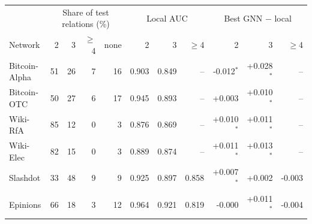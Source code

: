 \begin{tabular}{@{}lrrrrrrrrrr@{}}
\toprule
 & \multicolumn{4}{c}{Share of test relations (\%)} & \multicolumn{3}{c}{Local AUC} & \multicolumn{3}{c}{Best GNN $-$ local} \\
Network & 2 & 3 & $\ge$4 & none & 2 & 3 & $\ge$4 & 2 & 3 & $\ge$4 \\
\midrule
Bitcoin-Alpha & 51 & 26 & 7 & 16 & 0.903 & 0.849 & -- & -0.012$^\ast$ & +0.028$^\ast$ & -- \\
Bitcoin-OTC & 50 & 27 & 6 & 17 & 0.945 & 0.893 & -- & +0.003 & +0.010$^\ast$ & -- \\
Wiki-RfA & 85 & 12 & 0 & 3 & 0.876 & 0.869 & -- & +0.010$^\ast$ & +0.011$^\ast$ & -- \\
Wiki-Elec & 82 & 15 & 0 & 3 & 0.889 & 0.874 & -- & +0.011$^\ast$ & +0.013$^\ast$ & -- \\
Slashdot & 33 & 48 & 9 & 9 & 0.925 & 0.897 & 0.858 & +0.007$^\ast$ & +0.002 & -0.003 \\
Epinions & 66 & 18 & 3 & 12 & 0.964 & 0.921 & 0.819 & -0.000 & +0.011$^\ast$ & -0.004 \\
\bottomrule
\end{tabular}
